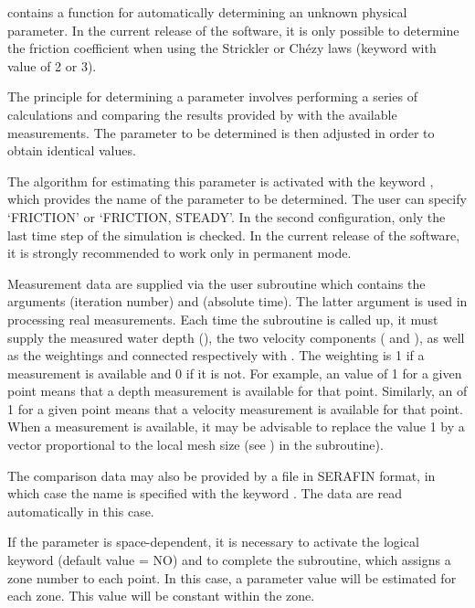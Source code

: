 contains a function for automatically determining an unknown
physical parameter.
In the current release of the software, it is only possible to determine the
friction coefficient when using the Strickler or Ch\'{e}zy laws (keyword
 with value of 2 or 3).

The principle for determining a parameter involves performing a series of
calculations and comparing the results provided by  with the
available measurements.
The parameter to be determined is then adjusted in order to obtain identical
values.

The algorithm for estimating this parameter is activated with the keyword
, which provides the name of the parameter to be
determined.
The user can specify `FRICTION' or `FRICTION, STEADY'.
In the second configuration, only the last time step of the simulation is
checked.
In the current release of the software, it is strongly recommended to work only
in permanent mode.

Measurement data are supplied via the  user subroutine
which contains the arguments  (iteration number) and 
(absolute time).
The latter argument is used in processing real measurements.
Each time the  subroutine is called up,
it must supply the measured water depth (),
the two velocity components ( and ),
as well as the weightings  and 
connected respectively with .
The weighting is 1 if a measurement is available and 0 if it is not.
For example, an  value of 1 for a given point means
that a depth measurement is available for that point.
Similarly, an  of 1 for a given point means that a velocity
measurement  is available for that point.
When a measurement is available, it may be advisable to replace the value 1
by a vector proportional to the local mesh size
(see ) in the 
subroutine).

The comparison data may also be provided by a file in SERAFIN format,
in which case the name is specified with the keyword .
The data are read automatically in this case.

If the parameter is space-dependent, it is necessary to activate the logical
keyword  (default value = NO)
and to complete the  subroutine,
which assigns a zone number to each point.
In this case, a parameter value will be estimated for each zone.
This value will be constant within the zone.

